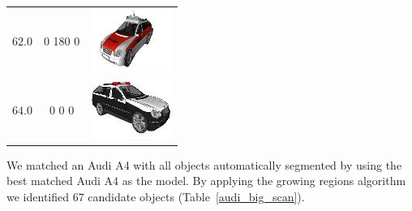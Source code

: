\documentclass{llncs}
\begin{document}
\begin{longtable}{ccc}
  	$62.0$ & 0 180 0 & \includegraphics{models/2fb672709e5ad6fcf9175fe1c361ba4b.jpg}\\
  	$64.0$ & 0 0 0 & \includegraphics{models/b8195274e20909a39972a46f964becf.jpg}\\
  \end{longtable}

We matched an Audi A4 with all objects automatically segmented by
using the best matched Audi A4 as the model. By applying the growing
regions algorithm we identified $67$ candidate objects (Table~\ref{audi_big_scan}).
\end{document}
